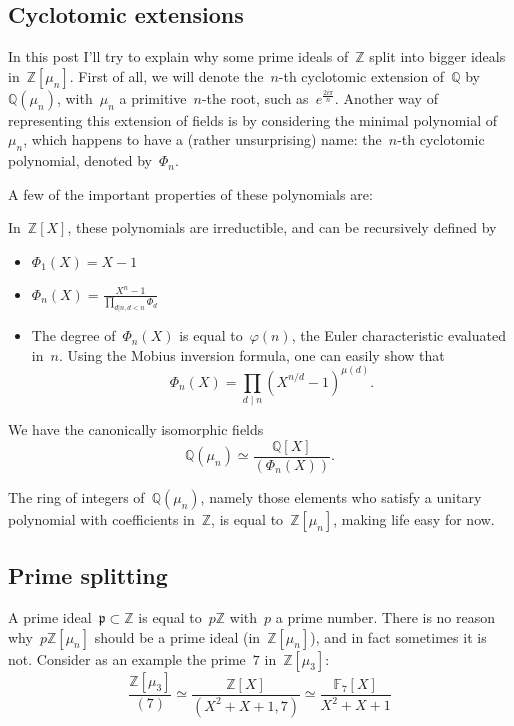 \subsection{Cyclotomic extensions}

In this post I'll try to explain why some prime ideals of~${\mathbb{Z}}$ split into bigger ideals in~${\mathbb{Z}[\mu_n]}$. First of all, we will denote the~${n}$-th cyclotomic extension of~${\mathbb{Q}}$ by~${\mathbb{Q}(\mu_n)}$, with~${\mu_n}$ a primitive~${n}$-the root, such as~${e^{\frac{2i\pi}{n}}}$. Another way of representing this extension of fields is by considering the minimal polynomial of~${\mu_n}$, which happens to have a (rather unsurprising) name: the~${n}$-th cyclotomic polynomial, denoted by~${\Phi_n}$.

A few of the important properties of these polynomials are:

In~${\mathbb{Z}[X]}$, these polynomials are irreductible, and can be recursively defined by
\begin{itemize}
	\item $ \Phi_1(X) = X - 1~$
	\item $ \Phi_n(X) = \frac{X^n - 1}{\prod_{d|n, d < n}\Phi_d}~$
	\item The degree of~${\Phi_n(X)}$ is equal to~${\varphi(n)}$, the Euler characteristic evaluated in~${n}$. Using the Mobius inversion formula, one can easily show that
    \begin{equation}
      \Phi_n(X) = \prod_{d\mid n} \left( X^{n/d} - 1 \right)^{\mu(d)}  .
    \end{equation}
\end{itemize}

We have the canonically isomorphic fields
\begin{equation}
  \mathbb{Q}(\mu_n) \simeq \frac{\mathbb{Q}[X]}{(\Phi_n(X))} .
\end{equation}

The ring of integers of~${\mathbb{Q}(\mu_n)}$, namely those elements who satisfy a unitary polynomial with coefficients in~${\mathbb{Z}}$, is equal to~${\mathbb{Z}[\mu_n]}$, making life easy for now.

\subsection{Prime splitting}

A prime ideal~${\mathfrak{p} \subset \mathbb{Z} }$ is equal to~${p\mathbb{Z}}$ with~${p}$ a prime number. There is no reason why~${p\mathbb{Z}[\mu_n]}$ should be a prime ideal (in~${\mathbb{Z}[\mu_n]}$), and in fact sometimes it is not. Consider as an example the prime~${7}$ in~${\mathbb{Z}[\mu_3]}$:
\begin{equation}
  \frac{\mathbb{Z}[\mu_3]}{(7)} \simeq \frac{\mathbb{Z}[X]}{(X^2 + X + 1, 7)} \simeq \frac{\mathbb{F}_7[X]}{X^2 + X + 1}
\end{equation}

